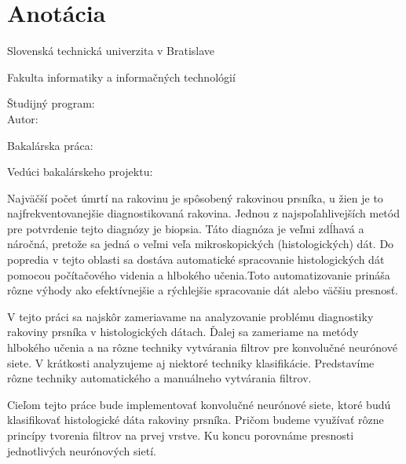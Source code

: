\thispagestyle{empty}

\section*{Anotácia}

\begin{minipage}[t]{1\columnwidth}%
Slovenská technická univerzita v Bratislave

Fakulta informatiky a informačných technológií

Študijný program: \myStudyProgram\\

Autor: \myName

Bakalárska práca: \myTitle

Vedúci bakalárskeho projektu: \mySupervisor

\myDate%
\end{minipage}

\bigskip{}
\hspace{10mm}Najväčší počet úmrtí na rakovinu je spôsobený rakovinou prsníka, u žien je to najfrekventovanejšie diagnostikovaná rakovina. Jednou z najspoľahlivejších metód pre potvrdenie tejto diagnózy je biopsia. Táto diagnóza je veľmi zdĺhavá a náročná, pretože sa jedná o veľmi veľa mikroskopických (histologických) dát. Do popredia v tejto oblasti sa dostáva automatické spracovanie histologických dát pomocou počítačového videnia a hlbokého učenia.Toto automatizovanie prináša rôzne výhody ako efektívnejšie a rýchlejšie spracovanie dát alebo väčšiu presnosť.

\hspace{10mm}V tejto práci sa najskôr zameriavame na analyzovanie problému diagnostiky rakoviny prsníka v histologických dátach. Ďalej sa zameriame na metódy hlbokého učenia a na rôzne techniky vytvárania filtrov pre konvolučné neurónové siete. V krátkosti analyzujeme aj niektoré techniky klasifikácie. Predstavíme rôzne techniky automatického a manuálneho vytvárania filtrov. 

\hspace{10mm}Cieľom tejto práce bude implementovať konvolučné neurónové siete, ktoré budú klasifikovať histologické dáta rakoviny prsníka. Pričom budeme využívať rôzne princípy tvorenia filtrov na prvej vrstve. Ku koncu porovnáme presnosti jednotlivých neurónových sietí. 

\newpage{}\thispagestyle{empty}

\newpage
\thispagestyle{empty}
\mbox{}
\newpage

